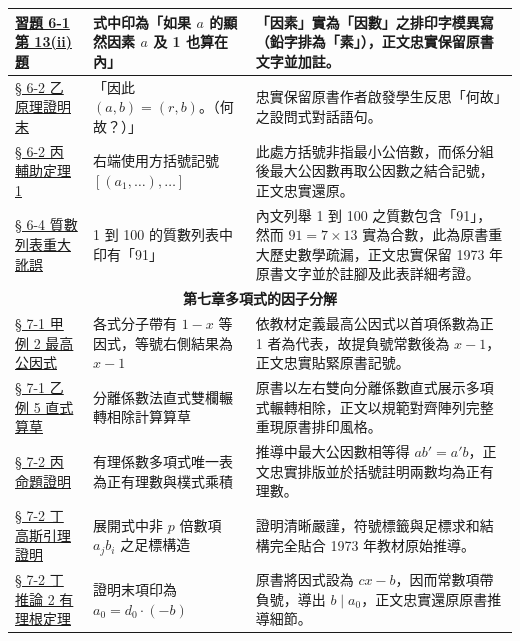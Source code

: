 \documentclass[a4paper,12pt,twoside]{article}
\begin{document}
\begin{table}[H]
\begin{tabularx}{\textwidth}{|p{3.0cm}|p{3.8cm}|X|}
\hyperref[item:ex6-1-13-2]{習題 6-1 第 13(ii) 題} & 
式中印為「如果 $a$ 的顯然因素 $a$ 及 1 也算在內」 & 
「因素」實為「因數」之排印字模異寫（鉛字排為「素」），正文忠實保留原書文字並加註。 \\ \hline

\hyperref[note:ch6-why-euclid]{§ 6-2 乙 原理證明末} & 
「因此 $(a, b) = (r, b)$。（何故？）」 & 
忠實保留原書作者啟發學生反思「何故」之設問式對話語句。 \\ \hline

\hyperref[note:ch6-gcd-bracket]{§ 6-2 丙 輔助定理 1} & 
右端使用方括號記號 $[(a_1, \dots), \dots]$ & 
此處方括號非指最小公倍數，而係分組後最大公因數再取公因數之結合記號，正文忠實還原。 \\ \hline

\hyperref[note:ch6-prime91]{§ 6-4 質數列表重大訛誤} & 
1 到 100 的質數列表中印有「91」 & 
內文列舉 1 到 100 之質數包含「91」，然而 $91 = 7 \times 13$ 實為合數，此為原書重大歷史數學疏漏，正文忠實保留 1973 年原書文字並於註腳及此表詳細考證。 \\ \hline

\multicolumn{3}{|c|}{\textbf{第七章\quad 多項式的因子分解}} \\ \hline

\hyperref[subsec:7-1-a]{§ 7-1 甲 例 2 最高公因式} & 
各式分子帶有 $1-x$ 等因式，等號右側結果為 $x-1$ & 
依教材定義最高公因式以首項係數為正 1 者為代表，故提負號常數後為 $x-1$，正文忠實貼緊原書記號。 \\ \hline

\hyperref[subsec:7-1-b]{§ 7-1 乙 例 5 直式算草} & 
分離係數法直式雙欄輾轉相除計算算草 & 
原書以左右雙向分離係數直式展示多項式輾轉相除，正文以規範對齊陣列完整重現原書排印風格。 \\ \hline

\hyperref[prop:primitive_unique]{§ 7-2 丙 命題證明} & 
有理係數多項式唯一表為正有理數與樸式乘積 & 
推導中最大公因數相等得 $ab'=a'b$，正文忠實排版並於括號註明兩數均為正有理數。 \\ \hline

\hyperref[lem:gauss]{§ 7-2 丁 高斯引理證明} & 
展開式中非 $p$ 倍數項 $a_j b_i$ 之足標構造 & 
證明清晰嚴謹，符號標籤與足標求和結構完全貼合 1973 年教材原始推導。 \\ \hline

\hyperref[cor:rational_root]{§ 7-2 丁 推論 2 有理根定理} & 
證明末項印為 $a_0 = d_0 \cdot (-b)$ & 
原書將因式設為 $cx-b$，因而常數項帶負號，導出 $b \mid a_0$，正文忠實還原原書推導細節。 \\ \hline


\end{tabularx}
\end{table}
\end{document}
